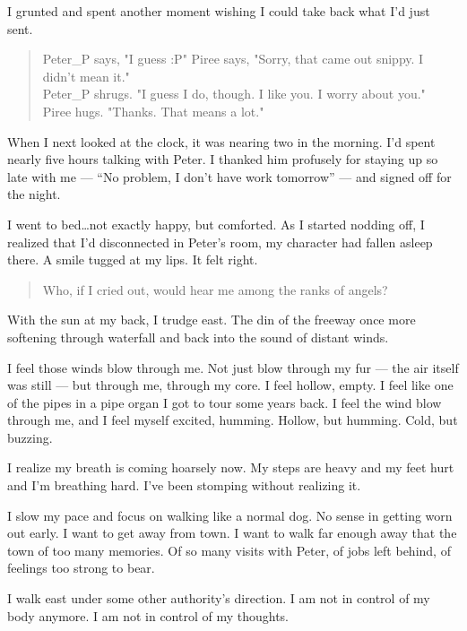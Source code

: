 I grunted and spent another moment wishing I could take back what I'd just sent.

\begin{verse}
    {\ttfamily
Peter\_P says, "I guess :P"
Piree says, "Sorry, that came out snippy. I didn't mean it."\\
Peter\_P shrugs. "I guess I do, though. I like you. I worry about you."\\
Piree hugs. "Thanks. That means a lot."}
\end{verse}

When I next looked at the clock, it was nearing two in the morning. I'd spent nearly five hours talking with Peter. I thanked him profusely for staying up so late with me --- ``No problem, I don't have work tomorrow'' --- and signed off for the night.

I went to bed\ldots{}not exactly happy, but comforted. As I started nodding off, I realized that I'd disconnected in Peter's room, my character had fallen asleep there. A smile tugged at my lips. It felt right.

\secdiv{}

\noindent \begin{verse}
Who, if I cried out, would hear me among the ranks of angels?
\end{verse}

With the sun at my back, I trudge east. The din of the freeway once more softening through waterfall and back into the sound of distant winds.

I feel those winds blow through me. Not just blow through my fur --- the air itself was still --- but through me, through my core. I feel hollow, empty. I feel like one of the pipes in a pipe organ I got to tour some years back. I feel the wind blow through me, and I feel myself excited, humming. Hollow, but humming. Cold, but buzzing.

I realize my breath is coming hoarsely now. My steps are heavy and my feet hurt and I'm breathing hard. I've been stomping without realizing it.

I slow my pace and focus on walking like a normal dog. No sense in getting worn out early. I want to get away from town. I want to walk far enough away that the town of too many memories. Of so many visits with Peter, of jobs left behind, of feelings too strong to bear.

I walk east under some other authority's direction. I am not in control of my body anymore. I am not in control of my thoughts.

